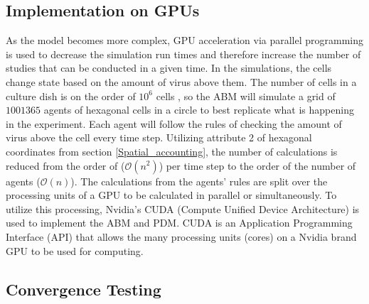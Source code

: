\subsection{Implementation on GPUs}

As the model becomes more complex, GPU acceleration via parallel programming is used to decrease the simulation run times and therefore increase the number of studies that can be conducted in a given time. In the simulations, the cells change state based on the amount of virus above them. The number of cells in a culture dish is on the order of $10^6$ cells \citep{Number_of_cells_in_a_dish}, so the ABM will simulate a grid of $1001365$ agents of hexagonal cells in a circle to best replicate what is happening in the experiment. Each agent will follow the rules of checking the amount of virus above the cell every time step. Utilizing attribute 2 of hexagonal coordinates from section \ref{Spatial_accounting}, the number of calculations is reduced from the order of ($\mathcal{O}(n^2)$) per time step to the order of the number of agents ($\mathcal{O}(n)$). The calculations from the agents' rules are split over the processing units of a GPU to be calculated in parallel or simultaneously. To utilize this processing, Nvidia's CUDA (Compute Unified Device Architecture) is used to implement the ABM and PDM. CUDA is an Application Programming Interface (API) that allows the many processing units (cores) on a Nvidia brand GPU to be used for computing. %



\subsection{Convergence Testing} \label{methods_convergance}

